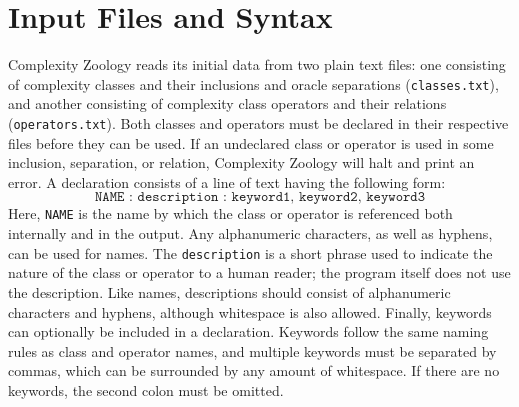 \section{Input Files and Syntax}

Complexity Zoology reads its initial data from two plain text files: one
consisting of complexity classes and their inclusions and oracle separations
(\texttt{classes.txt}), and another consisting of complexity class operators
and their relations (\texttt{operators.txt}). Both classes and operators must be
declared in their respective files before they can be used. If an undeclared
class or operator is used in some inclusion, separation, or relation, Complexity
Zoology will halt and print an error. A declaration consists of a line of text
having the following form:
\[
\texttt{NAME : description : keyword1, keyword2, keyword3}
\]
Here, \texttt{NAME} is the name by which the class or operator is referenced
both internally and in the output. Any alphanumeric characters, as well as
hyphens, can be used for names. The \texttt{description} is a short phrase
used to indicate the nature of the class or operator to a human reader; the
program itself does not use the description. Like names, descriptions should
consist of alphanumeric characters and hyphens, although whitespace is also
allowed. Finally, keywords can optionally be included in a declaration.
Keywords follow the same naming rules as class and operator names, and multiple
keywords must be separated by commas, which can be surrounded by any amount of
whitespace. If there are no keywords, the second colon must be omitted.


